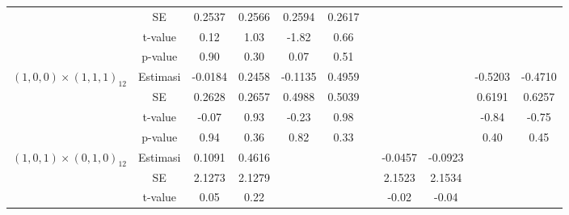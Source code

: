 \begin{enumerate}[label=\alph*.]
\begin{longtable}{|c|c|c|c|c|c|c|c|c|c|c|}
            & SE
            & {0.2537} & {0.2566}
            & {0.2594} & {0.2617} & {}
            & {} & {}
            & {} & {} \\ \cline{2-11}

            & t-value
            & {0.12} & {1.03}
            & {-1.82} & {0.66} & {}
            & {} & {}
            & {} & {} \\ \cline{2-11}

            & p-value
            & {0.90} & {0.30}
            & {0.07} & {0.51} & {}
            & {} & {}
            & {} & {} \\ \hline

            \multirow{4}{*}{$(1,0,0)\times(1,1,1)_{12}$}
            & Estimasi
            & {-0.0184} & {0.2458}
            & {-0.1135} & {0.4959} & {}
            & {} & {}
            & {-0.5203} & {-0.4710} \\ \cline{2-11}

            & SE
            & {0.2628} & {0.2657}
            & {0.4988} & {0.5039} & {}
            & {} & {}
            & {0.6191} & {0.6257} \\ \cline{2-11}

            & t-value
            & {-0.07} & {0.93}
            & {-0.23} & {0.98} & {}
            & {} & {}
            & {-0.84} & {-0.75} \\ \cline{2-11}

            & p-value
            & {0.94} & {0.36}
            & {0.82} & {0.33} & {}
            & {} & {}
            & {0.40} & {0.45} \\ \hline

            \multirow{4}{*}{$(1,0,1)\times(0,1,0)_{12}$}
            & Estimasi
            & {0.1091} & {0.4616}
            & {} & {} & {}
            & {-0.0457} & {-0.0923}
            & {} & {} \\ \cline{2-11}

            & SE
            & {2.1273} & {2.1279}
            & {} & {} & {}
            & {2.1523} & {2.1534}
            & {} & {} \\ \cline{2-11}

            & t-value
            & {0.05} & {0.22}
            & {} & {} & {}
            & {-0.02} & {-0.04}
            & {} & {} \\ \cline{2-11}


\end{longtable}
\end{enumerate}
